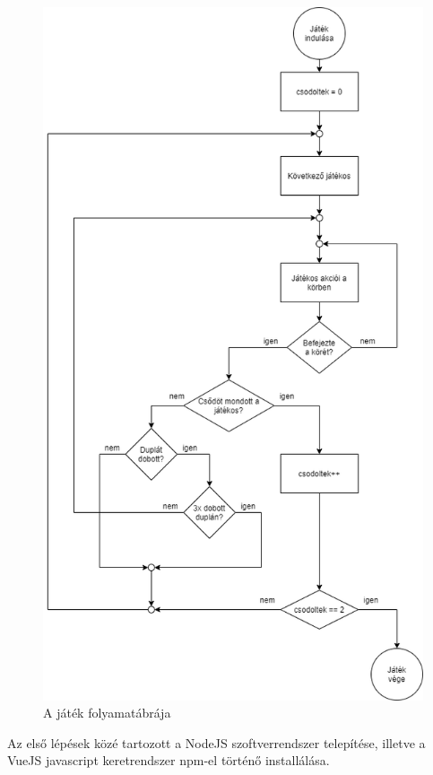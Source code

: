 \begin{figure}[h!]
\centering
\includegraphics[scale=0.6]{images/folyamata.png}
\caption{A játék folyamatábrája}
\label{fig:ff}
\end{figure}
\newpage
{}

Az első lépések közé tartozott a NodeJS szoftverrendszer telepítése, illetve a VueJS javascript keretrendszer npm-el történő installálása.

